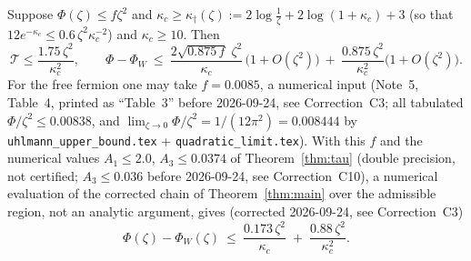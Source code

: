 \documentclass[11pt]{article}
\begin{document}

\begin{corollary}\label{cor:rate}
Suppose $\Phi(\zeta)\le f\zeta^2$ and $\kappa_c\ge\kappa_\dagger(\zeta):=2\log\frac1\zeta+2\log(1+\kappa_c)+3$
(so that $12e^{-\kappa_c}\le0.6\,\zeta^2\kappa_c^{-2}$) and $\kappa_c\ge10$.  Then
\[
 \mathcal T\le\frac{1.75\,\zeta^2}{\kappa_c^{2}},\qquad
 \Phi-\Phi_W\ \le\ \frac{2\sqrt{0.875\,f}\;\zeta^{2}}{\kappa_c}\,\bigl(1+O(\zeta^2)\bigr)
 \ +\ \frac{0.875\,\zeta^2}{\kappa_c^2}\bigl(1+O(\zeta^2)\bigr).
\]
For the free fermion one may take $f=0.0085$, a numerical input (Note~5, Table~4, printed as ``Table~3'' before 2026-09-24, see Correction~C3; all tabulated $\Phi/\zeta^2\le0.00838$,
and $\lim_{\zeta\to0}\Phi/\zeta^2=1/(12\pi^2)=0.008444$ by \texttt{uhlmann\_upper\_bound.tex} +
\texttt{quadratic\_limit.tex}).  With this $f$ and the numerical values $A_1\le2.0$, $A_3\le0.0374$ of Theorem~\ref{thm:tau} (double precision, not certified; $A_3\le0.036$ before 2026-09-24, see Correction~C10), a numerical evaluation of the corrected chain of Theorem~\ref{thm:main} over the admissible region, not an analytic argument, gives (corrected 2026-09-24, see Correction~C3)
\begin{equation}\label{eq:final}
 \Phi(\zeta)-\Phi_W(\zeta)\ \le\ \frac{0.173\,\zeta^2}{\kappa_c}\;+\;\frac{0.88\,\zeta^2}{\kappa_c^2}.
\end{equation}
\end{corollary}
\end{document}
